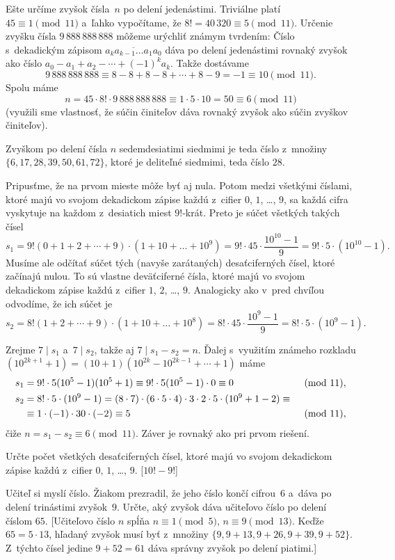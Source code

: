 {Ešte určíme zvyšok čísla~$n$ po delení jedenástimi. Triviálne platí $45\equiv1\pmod{11}$ a~ľahko vypočítame, že $8!=40\,320\equiv5\pmod{11}$. Určenie zvyšku čísla $9\,888\,888\,888$ môžeme urýchliť známym tvrdením: Číslo s~dekadickým zápisom $\overline{a_ka_{k-1}\dots a_1a_0}$ dáva po delení jedenástimi rovnaký zvyšok ako číslo $a_0-a_1+a_2-\cdots+(-1)^ka_k$. Takže dostávame
$$
9\,888\,888\,888\equiv 8-8+8-8+\cdots+8-9=-1\equiv10\pmod{11}.
$$
Spolu máme
$$
n=45\cdot8!\cdot9\,888\,888\,888\equiv 1\cdot5\cdot10=50\equiv6\pmod{11}
$$
(využili sme vlastnosť, že súčin činiteľov dáva rovnaký zvyšok ako súčin zvyškov činiteľov).

Zvyškom po delení čísla $n$ sedemdesiatimi siedmimi je teda číslo z~množiny $\{6,17,28,39,50,61,72\}$, ktoré je deliteľné siedmimi,
teda číslo $28$.

\ineriesenie
Pripusťme, že na prvom mieste môže byť aj nula. Potom medzi všetkými číslami,
ktoré majú vo svojom dekadickom zápise každú z~cifier $0$, $1$, \dots, $9$, sa každá
cifra vyskytuje na každom z~desiatich miest $9!$-krát. Preto je súčet všetkých
takých čísel
$$
s_1=9!(0+1+2+\cdots+9)\cdot(1+10+\dots+10^9)=9!\cdot45\cdot\frac{10^{10}-1}9=9!\cdot5\cdot(10^{10}-1).
$$
Musíme ale odčítať súčet tých (navyše zarátaných) desaťciferných čísel, ktoré
začínajú nulou. To sú vlastne deväťciferné čísla, ktoré majú vo svojom dekadickom
zápise každú z~cifier $1$, $2$, \dots, $9$. Analogicky ako v~pred chvíľou odvodíme, že ich súčet je
$$
s_2=8!(1+2+\cdots+9)\cdot(1+10+\dots+10^8)=8!\cdot45\cdot\frac{10^9-1}9=8!\cdot5\cdot(10^9-1).
$$

Zrejme $7\mid s_1$ a~$7\mid s_2$, takže aj $7\mid s_1-s_2=n$. Ďalej s~využitím známeho rozkladu $(10^{2k+1}+1)=(10+1)(10^{2k}-10^{2k-1}+\cdots+1)$ máme
$$
\alignedat2
s_1&=9!\cdot5(10^5-1)(10^5+1)\equiv9!\cdot5(10^5-1)\cdot0\equiv0 & &\quad\pmod{11},\\
s_2&=8!\cdot5\cdot(10^9-1)=(8\cdot7)\cdot(6\cdot5\cdot4)\cdot3\cdot2\cdot5\cdot(10^9+1-2)\equiv & &\\
   &\equiv 1\cdot(-1)\cdot30\cdot(-2)\equiv5 & &\quad\pmod{11},
\endalignedat
$$
čiže $n=s_1-s_2\equiv6\pmod{11}$. Záver je rovnaký ako pri prvom riešení.

Určte počet všetkých desaťciferných čísel, ktoré majú vo svojom dekadickom zápise každú z~cifier $0$, $1$, \dots, $9$. [$10!-9!$]

Učiteľ si myslí číslo. Žiakom prezradil, že jeho číslo končí cifrou~$6$ a~dáva po delení trinástimi zvyšok~$9$. Určte, aký zvyšok dáva učiteľovo číslo po delení číslom $65$. [Učiteľovo číslo $n$ spĺňa $n\equiv1\pmod5$, $n\equiv9\pmod{13}$. Keďže $65=5\cdot13$, hľadaný zvyšok musí byť z~množiny $\{9, 9+13, 9+26, 9+39, 9+52\}$. Z~týchto čísel jedine $9+52=61$ dáva správny zvyšok po delení piatimi.]

}
